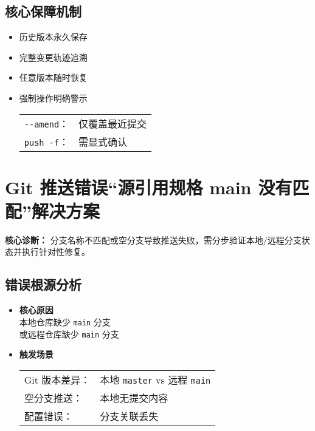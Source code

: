 \subsection{核心保障机制}
\begin{itemize}[leftmargin=*, nosep]
    \item 历史版本永久保存
    \item 完整变更轨迹追溯
    \item 任意版本随时恢复
    \item 强制操作明确警示 \\
    \begin{tabular}{@{}ll@{}}
        \texttt{{-}{-}amend}： & 仅覆盖最近提交 \\
        \texttt{push -f}： & 需显式确认 \\
    \end{tabular}
\end{itemize}





\section{Git 推送错误“源引用规格 main 没有匹配”解决方案}
\textbf{核心诊断：}  
分支名称不匹配或空分支导致推送失败，需分步验证本地/远程分支状态并执行针对性修复。

\subsection{错误根源分析}
\begin{itemize}[leftmargin=*, nosep]
    \item \textbf{核心原因} \\
    本地仓库缺少 \texttt{main} 分支 \\
    或远程仓库缺少 \texttt{main} 分支
    \item \textbf{触发场景} \\
    \begin{tabular}{@{}ll@{}}
        Git 版本差异： & 本地 \texttt{master} vs 远程 \texttt{main} \\
        空分支推送： & 本地无提交内容 \\
        配置错误： & 分支关联丢失 \\
    \end{tabular}
\end{itemize}

